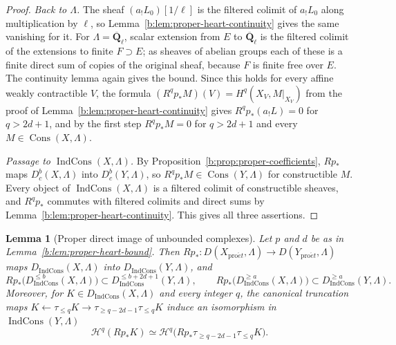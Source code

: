 \documentclass[11pt,a4paper]{article}
\numberwithin{equation}{section}
\newtheorem{lemma}[theorem]{Lemma}
\theoremstyle{definition}
\theoremstyle{remark}
\newcommand{\Dbc}{D^b_c}
\newcommand{\Qbar}{\overline{\mathbf Q}_\ell}
\newcommand{\proet}{\mathrm{pro}\acute{e}t}
\newcommand{\Cons}{\operatorname{Cons}}
\newcommand{\IndCons}{\operatorname{IndCons}}
\newcommand{\Dic}{D_{\IndCons}}
\begin{document}
\begin{proof}
\emph{Back to $\Lambda$.} The sheaf $(a_!L_0)[1/\ell]$ is the filtered
colimit of $a_!L_0$ along multiplication by $\ell$, so
Lemma~\ref{b:lem:proper-heart-continuity} gives the same vanishing for
it. For $\Lambda=\Qbar$, scalar extension from $E$ to $\Qbar$ is the
filtered colimit of the extensions to finite $F\supset E$; as sheaves of
abelian groups each of these is a finite direct sum of copies of the
original sheaf, because $F$ is finite free over $E$. The continuity lemma
again gives the bound. Since this holds for every affine weakly
contractible $V$, the formula $(R^qp_*M)(V)=H^q(X_V,M|_{X_V})$ from the
proof of Lemma~\ref{b:lem:proper-heart-continuity} gives $R^qp_*(a_!L)=0$ for $q>2d+1$, and by the first
step $R^qp_*M=0$ for $q>2d+1$ and every $M\in\Cons(X,\Lambda)$.

\emph{Passage to $\IndCons(X,\Lambda)$.} By
Proposition~\ref{b:prop:proper-coefficients}, $Rp_*$ maps
$\Dbc(X,\Lambda)$ into $\Dbc(Y,\Lambda)$, so $R^qp_*M\in\Cons(Y,\Lambda)$
for constructible $M$. Every object of $\IndCons(X,\Lambda)$ is a filtered
colimit of constructible sheaves, and $R^qp_*$ commutes with filtered
colimits and direct sums by Lemma~\ref{b:lem:proper-heart-continuity}.
This gives all three assertions.
\end{proof}

\begin{lemma}[Proper direct image of unbounded complexes]
\label{b:lem:proper-unbounded-window}
Let $p$ and $d$ be as in Lemma~\ref{b:lem:proper-heart-bound}. Then
$Rp_*\colon D(X_{\proet},\Lambda)\to D(Y_{\proet},\Lambda)$ maps $\Dic(X,\Lambda)$ into $\Dic(Y,\Lambda)$, and
\[
 Rp_*\bigl(\Dic^{\leq b}(X,\Lambda)\bigr)
       \subset\Dic^{\leq b+2d+1}(Y,\Lambda),
 \qquad
 Rp_*\bigl(\Dic^{\geq a}(X,\Lambda)\bigr)
       \subset\Dic^{\geq a}(Y,\Lambda).
\]
Moreover, for $K\in\Dic(X,\Lambda)$ and every integer $q$, the canonical
truncation maps $K\leftarrow\tau_{\leq q}K\to\tau_{\geq q-2d-1}\tau_{\leq q}K$
induce an isomorphism in $\IndCons(Y,\Lambda)$
\begin{equation}
 \mathcal H^q(Rp_*K)\simeq
 \mathcal H^q\bigl(Rp_*\tau_{\geq q-2d-1}\tau_{\leq q}K\bigr).
 \label{b:eq:proper-window}
\end{equation}
\end{lemma}
\end{document}

